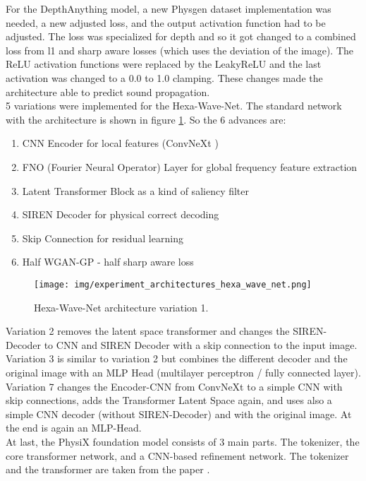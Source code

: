 		For the DepthAnything model, a new Physgen dataset implementation was needed, a new adjusted loss, and the output activation function had to be adjusted. The loss was specialized for depth and so it got changed to a combined loss from l1 and sharp aware losses (which uses the deviation of the image). The ReLU activation functions were replaced by the LeakyReLU and the last activation was changed to a 0.0 to 1.0 clamping. These changes made the architecture able to predict sound propagation.\\
		5 variations were implemented for the Hexa-Wave-Net. The standard network with the architecture is shown in figure \ref{fig:experiment_architecture_hexa_wave_net}. So the 6 advances are:
		\begin{enumerate}[itemsep=1mm, parsep=0pt]
			\item CNN Encoder for local features (ConvNeXt \cite{liu2022convnet2020s})
			\item FNO (Fourier Neural Operator) Layer for global frequency feature extraction
			\item Latent Transformer Block as a kind of saliency filter
			\item SIREN Decoder for physical correct decoding
			\item Skip Connection for residual learning
			\item Half WGAN-GP - half sharp aware loss
		\end{enumerate}
		
		\begin{figure}[H]
			\centering
			\texttt{[image: img/experiment\_architectures\_hexa\_wave\_net.png]}
			\caption[Hexa-Wave-Net architecture variation 1.]{Hexa-Wave-Net architecture variation 1.}
			\label{fig:experiment_architecture_hexa_wave_net}
		\end{figure}
		\FloatBarrier
		
		\clearpage
		Variation 2 removes the latent space transformer and changes the SIREN-Decoder to CNN and SIREN Decoder with a skip connection to the input image.\\
		Variation 3 is similar to variation 2 but combines the different decoder and the original image with an MLP Head (multilayer perceptron / fully connected layer).\\
		Variation 7 changes the Encoder-CNN from ConvNeXt to a simple CNN with skip connections, adds the Transformer Latent Space again, and uses also a simple CNN decoder (without SIREN-Decoder) and with the original image. At the end is again an MLP-Head.\\
		At last, the PhysiX foundation model consists of 3 main parts. The tokenizer, the core transformer network, and a CNN-based refinement network. The tokenizer and the transformer are taken from the  paper \cite{nguyen2025physixfoundationmodelphysics}\cite{nvidia2025cosmosworldfoundationmodel}.
		
